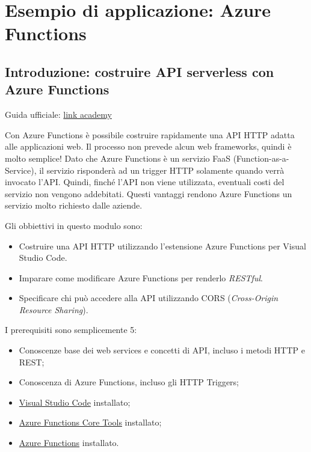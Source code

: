\documentclass[a4paper]{article}
\begin{document}
	\section{Esempio di applicazione: Azure Functions}
	
	\subsection{Introduzione: costruire API serverless con Azure Functions}
	
	Guida ufficiale: \href{https://learn.microsoft.com/en-gb/training/modules/build-api-azure-functions/}{link academy}\newline
	
	\noindent
	Con Azure Functions	è possibile costruire rapidamente una API HTTP adatta alle applicazioni web. Il processo non prevede alcun web frameworks, quindi è molto semplice! Dato che Azure Functions è un servizio FaaS (Function-as-a-Service), il servizio risponderà ad un trigger HTTP solamente quando verrà invocato l'API. Quindi, finché l'API non viene utilizzata, eventuali costi del servizio non vengono addebitati. Questi vantaggi rendono Azure Functions un servizio molto richiesto dalle aziende.\newline
	
	\noindent
	Gli obbiettivi in questo modulo sono:
	\begin{itemize}
		\item Costruire una API HTTP utilizzando l'estensione Azure Functions per Visual Studio Code.
		
		\item Imparare come modificare Azure Functions per renderlo \emph{RESTful}.
		
		\item Specificare chi può accedere alla API utilizzando CORS (\emph{Cross-Origin Resource Sharing}).
	\end{itemize}
	I prerequisiti sono semplicemente 5:
	\begin{itemize}
		\item Conoscenze base dei web services e concetti di API, incluso i metodi HTTP e REST;
		
		\item Conoscenza di Azure Functions, incluso gli HTTP Triggers;
		
		\item \href{https://code.visualstudio.com/}{Visual Studio Code} installato;
		
		\item \href{https://github.com/Azure/azure-functions-core-tools}{Azure Functions Core Tools} installato;
		
		\item \href{https://marketplace.visualstudio.com/items?itemName=ms-azuretools.vscode-azurefunctions}{Azure Functions} installato.
	\end{itemize}\newpage
	
\end{document}
